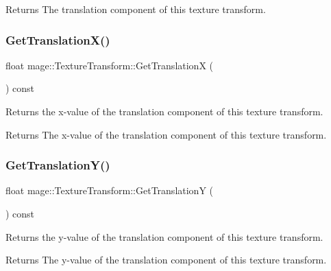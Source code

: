 \begin{DoxyReturn}{Returns}
The translation component of this texture transform. 
\end{DoxyReturn}
\hypertarget{structmage_1_1_texture_transform_a4f9910896c1b2479d096631133e07fb2}{}\label{structmage_1_1_texture_transform_a4f9910896c1b2479d096631133e07fb2} 
\subsubsection{\texorpdfstring{Get\+Translation\+X()}{GetTranslationX()}}
{\footnotesize\ttfamily float mage\+::\+Texture\+Transform\+::\+Get\+TranslationX (\begin{DoxyParamCaption}{ }\end{DoxyParamCaption}) const\hspace{0.3cm}{\ttfamily [noexcept]}}

Returns the x-\/value of the translation component of this texture transform.

\begin{DoxyReturn}{Returns}
The x-\/value of the translation component of this texture transform. 
\end{DoxyReturn}
\hypertarget{structmage_1_1_texture_transform_acf1d96efb1c8062388c4ad96c50f793c}{}\label{structmage_1_1_texture_transform_acf1d96efb1c8062388c4ad96c50f793c} 
\subsubsection{\texorpdfstring{Get\+Translation\+Y()}{GetTranslationY()}}
{\footnotesize\ttfamily float mage\+::\+Texture\+Transform\+::\+Get\+TranslationY (\begin{DoxyParamCaption}{ }\end{DoxyParamCaption}) const\hspace{0.3cm}{\ttfamily [noexcept]}}

Returns the y-\/value of the translation component of this texture transform.

\begin{DoxyReturn}{Returns}
The y-\/value of the translation component of this texture transform. 
\end{DoxyReturn}
\hypertarget{structmage_1_1_texture_transform_a0166da366dcf3054db133dda5867cf87}{}\label{structmage_1_1_texture_transform_a0166da366dcf3054db133dda5867cf87} 
